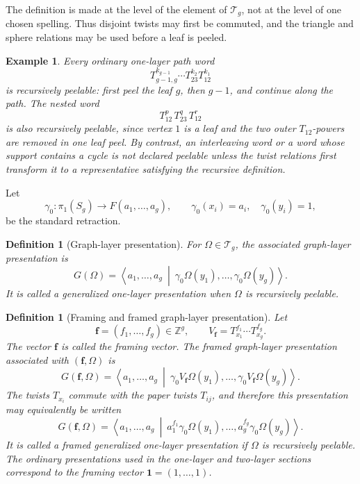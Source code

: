\documentclass{article}
\newtheorem{df}[theorem]{Definition}
\newtheorem{example}[theorem]{Example}
\begin{document}
The definition is made at the level of the element of $\mathcal T_g$, not at
the level of one chosen spelling.  Thus disjoint twists may first be commuted,
and the triangle and sphere relations may be used before a leaf is peeled.

\begin{example}
Every ordinary one-layer path word
\[
 T_{g-1,g}^{k_{g-1}}\cdots T_{23}^{k_2}T_{12}^{k_1}
\]
is recursively peelable: first peel the leaf $g$, then $g-1$, and continue
along the path.  The nested word
\[
 T_{12}^{p}\,T_{23}^{q}\,T_{12}^{r}
\]
is also recursively peelable, since vertex $1$ is a leaf and the two outer
$T_{12}$-powers are removed in one leaf peel.  By contrast, an interleaving
word or a word whose support contains a cycle is not declared peelable unless
the twist relations first transform it to a representative satisfying the
recursive definition.
\end{example}

Let
\[
 \gamma_0:\pi_1(S_g)\longrightarrow F(a_1,\ldots,a_g),
 \qquad
 \gamma_0(x_i)=a_i,
 \quad
 \gamma_0(y_i)=1,
\]
be the standard retraction.

\begin{df}[Graph-layer presentation]
For $\Omega\in\mathcal T_g$, the associated \emph{graph-layer presentation}
is
\[
 G(\Omega)=
 \left\langle a_1,\ldots,a_g\ \middle|\
 \gamma_0\Omega(y_1),\ldots,\gamma_0\Omega(y_g)
 \right\rangle.
\]
It is called a \emph{generalized one-layer presentation} when $\Omega$ is
recursively peelable.
\end{df}

\begin{df}[Framing and framed graph-layer presentation]
Let
\[
 \mathbf f=(f_1,\ldots,f_g)\in\mathbb Z^g,
 \qquad
 V_{\mathbf f}=T_{x_1}^{f_1}\cdots T_{x_g}^{f_g}.
\]
The vector $\mathbf f$ is called the \emph{framing vector}.  The
\emph{framed graph-layer presentation} associated with
$(\mathbf f,\Omega)$ is
\[
 G(\mathbf f,\Omega)=
 \left\langle a_1,\ldots,a_g\ \middle|\
 \gamma_0V_{\mathbf f}\Omega(y_1),\ldots,
 \gamma_0V_{\mathbf f}\Omega(y_g)
 \right\rangle.
\]
The twists $T_{x_i}$ commute with the paper twists $T_{ij}$, and therefore
this presentation may equivalently be written
\begin{equation}
 G(\mathbf f,\Omega)=
 \left\langle a_1,\ldots,a_g\ \middle|\
 a_1^{f_1}\gamma_0\Omega(y_1),\ldots,
 a_g^{f_g}\gamma_0\Omega(y_g)
 \right\rangle.
 \label{eq:framed-graph-layer-presentation}
\end{equation}
It is called a \emph{framed generalized one-layer presentation} if
$\Omega$ is recursively peelable.  The ordinary presentations used in the
one-layer and two-layer sections correspond to the framing vector
$\mathbf 1=(1,\ldots,1)$.
\end{df}
\end{document}
